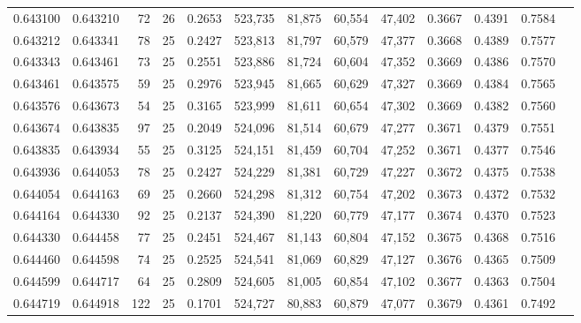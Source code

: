 \begin{tabular}{rrrrrrrrrrrrr}
0.643100 & 0.643210 &    72 &  26 &                                     0.2653 & 523,735 &  81,875 &  60,554 &  47,402 & 0.3667 & 0.4391 & 0.7584 \\
0.643212 & 0.643341 &    78 &  25 &                                     0.2427 & 523,813 &  81,797 &  60,579 &  47,377 & 0.3668 & 0.4389 & 0.7577 \\
0.643343 & 0.643461 &    73 &  25 &                                     0.2551 & 523,886 &  81,724 &  60,604 &  47,352 & 0.3669 & 0.4386 & 0.7570 \\
0.643461 & 0.643575 &    59 &  25 &                                     0.2976 & 523,945 &  81,665 &  60,629 &  47,327 & 0.3669 & 0.4384 & 0.7565 \\
0.643576 & 0.643673 &    54 &  25 &                                     0.3165 & 523,999 &  81,611 &  60,654 &  47,302 & 0.3669 & 0.4382 & 0.7560 \\
0.643674 & 0.643835 &    97 &  25 &                                     0.2049 & 524,096 &  81,514 &  60,679 &  47,277 & 0.3671 & 0.4379 & 0.7551 \\
0.643835 & 0.643934 &    55 &  25 &                                     0.3125 & 524,151 &  81,459 &  60,704 &  47,252 & 0.3671 & 0.4377 & 0.7546 \\
0.643936 & 0.644053 &    78 &  25 &                                     0.2427 & 524,229 &  81,381 &  60,729 &  47,227 & 0.3672 & 0.4375 & 0.7538 \\
0.644054 & 0.644163 &    69 &  25 &                                     0.2660 & 524,298 &  81,312 &  60,754 &  47,202 & 0.3673 & 0.4372 & 0.7532 \\
0.644164 & 0.644330 &    92 &  25 &                                     0.2137 & 524,390 &  81,220 &  60,779 &  47,177 & 0.3674 & 0.4370 & 0.7523 \\
0.644330 & 0.644458 &    77 &  25 &                                     0.2451 & 524,467 &  81,143 &  60,804 &  47,152 & 0.3675 & 0.4368 & 0.7516 \\
0.644460 & 0.644598 &    74 &  25 &                                     0.2525 & 524,541 &  81,069 &  60,829 &  47,127 & 0.3676 & 0.4365 & 0.7509 \\
0.644599 & 0.644717 &    64 &  25 &                                     0.2809 & 524,605 &  81,005 &  60,854 &  47,102 & 0.3677 & 0.4363 & 0.7504 \\
0.644719 & 0.644918 &   122 &  25 &                                     0.1701 & 524,727 &  80,883 &  60,879 &  47,077 & 0.3679 & 0.4361 & 0.7492 \\

\end{tabular}
